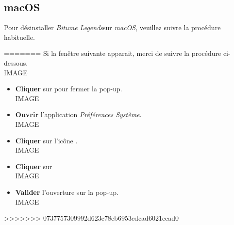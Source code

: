 \documentclass[a4paper,12pt]{article}
\newcommand{\btmlgs}{\textsl{Bitume Legends}}
\begin{document}
        \subsection*{macOS}
            Pour désinstaller \btmlgs\;sur \textsl{macOS}, veuillez suivre la procédure habituelle.

=======
        Si la fenêtre suivante apparait, merci de suivre la procédure ci-dessous.
        \\IMAGE

        \begin{itemize}
            \item 
                \textbf{Cliquer} sur  pour fermer la pop-up.
                \\IMAGE
            \item
                \textbf{Ouvrir} l'application \textsl{Préférences Système}.
                \\IMAGE
            \item
                \textbf{Cliquer} sur l'icône .
                \\IMAGE
             \item
                 \textbf{Cliquer} sur 
                \\IMAGE
             \item
                 \textbf{Valider} l'ouverture sur la pop-up.
                 \\IMAGE
        \end{itemize}

>>>>>>> 0737757309992d623e78eb6953edcad6021eead0
\end{document}
